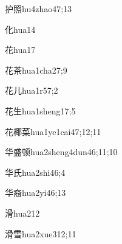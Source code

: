 \begin{verbete}{护照}{hu4zhao4}{7;13}
\end{verbete}

\begin{verbete}{化}{hua1}{4}
\end{verbete}

\begin{verbete}{花}{hua1}{7}
\end{verbete}

\begin{verbete}{花茶}{hua1cha2}{7;9}
\end{verbete}

\begin{verbete}{花儿}{hua1r5}{7;2}
\end{verbete}

\begin{verbete}{花生}{hua1sheng1}{7;5}
\end{verbete}

\begin{verbete}{花椰菜}{hua1ye1cai4}{7;12;11}
\end{verbete}

\begin{verbete}{华盛顿}{hua2sheng4dun4}{6;11;10}
\end{verbete}

\begin{verbete}{华氏}{hua2shi4}{6;4}
\end{verbete}

\begin{verbete}{华裔}{hua2yi4}{6;13}
\end{verbete}

\begin{verbete}{滑}{hua2}{12}
\end{verbete}

\begin{verbete}{滑雪}{hua2xue3}{12;11}
\end{verbete}

